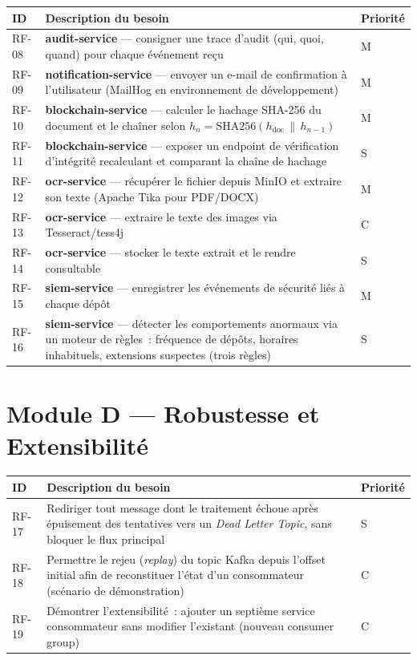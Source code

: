 \documentclass[12pt,a4paper,openany]{report}
\begin{document}
    \begin{longtable}{p{1.3cm}p{9.2cm}p{1.5cm}}
      \toprule
      \textbf{ID} & \textbf{Description du besoin} & \textbf{Priorit\'e} \\
      \midrule
      \endhead
      \bottomrule
      \endfoot

      RF-08 & \textbf{audit-service} --- consigner une trace d'audit (qui, quoi, quand) pour chaque \'ev\'enement re\c{c}u & M \\[4pt]
      RF-09 & \textbf{notification-service} --- envoyer un e-mail de confirmation \`a l'utilisateur (MailHog en environnement de d\'eveloppement) & M \\[4pt]
      RF-10 & \textbf{blockchain-service} --- calculer le hachage SHA-256 du document et le cha\^iner selon $h_n = \mathrm{SHA256}(h_{\mathrm{doc}} \,\|\, h_{n-1})$ & M \\[4pt]
      RF-11 & \textbf{blockchain-service} --- exposer un endpoint de v\'erification d'int\'egrit\'e recalculant et comparant la cha\^ine de hachage & S \\[4pt]
      RF-12 & \textbf{ocr-service} --- r\'ecup\'erer le fichier depuis MinIO et extraire son texte (Apache Tika pour PDF/DOCX) & M \\[4pt]
      RF-13 & \textbf{ocr-service} --- extraire le texte des images via Tesseract/tess4j & C \\[4pt]
      RF-14 & \textbf{ocr-service} --- stocker le texte extrait et le rendre consultable & S \\[4pt]
      RF-15 & \textbf{siem-service} --- enregistrer les \'ev\'enements de s\'ecurit\'e li\'es \`a chaque d\'ep\^ot & M \\[4pt]
      RF-16 & \textbf{siem-service} --- d\'etecter les comportements anormaux via un moteur de r\`egles~: fr\'equence de d\'ep\^ots, horaires inhabituels, extensions suspectes (trois r\`egles) & S \\
    \end{longtable}

    \section{Module D --- Robustesse et Extensibilit\'e}

    \begin{longtable}{p{1.3cm}p{9.2cm}p{1.5cm}}
      \toprule
      \textbf{ID} & \textbf{Description du besoin} & \textbf{Priorit\'e} \\
      \midrule
      \endhead
      \bottomrule
      \endfoot

      RF-17 & Rediriger tout message dont le traitement \'echoue apr\`es \'epuisement des tentatives vers un \emph{Dead Letter Topic}, sans bloquer le flux principal & S \\[4pt]
      RF-18 & Permettre le rejeu (\emph{replay}) du topic Kafka depuis l'offset initial afin de reconstituer l'\'etat d'un consommateur (sc\'enario de d\'emonstration) & C \\[4pt]
      RF-19 & D\'emontrer l'extensibilit\'e~: ajouter un septi\`eme service consommateur sans modifier l'existant (nouveau consumer group) & C \\
    \end{longtable}
\end{document}
